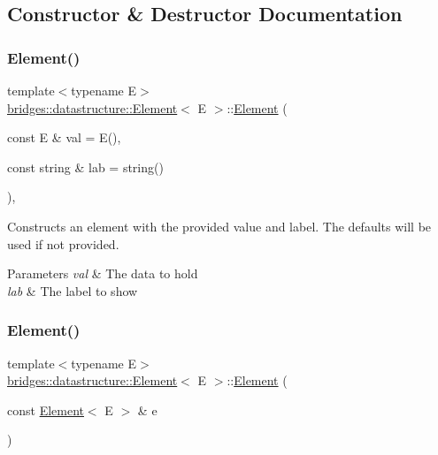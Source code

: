 \subsection{Constructor \& Destructor Documentation}
\mbox{\label{classbridges_1_1datastructure_1_1_element_a21820b1d88f2eb25adfe768bd03046d6}} 
\subsubsection{\texorpdfstring{Element()}{Element()}\hspace{0.1cm}{\footnotesize\ttfamily [1/2]}}
{\footnotesize\ttfamily template$<$typename E$>$ \\
\hyperlink{classbridges_1_1datastructure_1_1_element}{bridges\+::datastructure\+::\+Element}$<$ E $>$\+::\hyperlink{classbridges_1_1datastructure_1_1_element}{Element} (\begin{DoxyParamCaption}\item[{const E \&}]{val = {\ttfamily E()},  }\item[{const string \&}]{lab = {\ttfamily string()} }\end{DoxyParamCaption})\hspace{0.3cm}{\ttfamily [inline]}, {\ttfamily [explicit]}}

Constructs an element with the provided value and label. The defaults will be used if not provided.


\begin{DoxyParams}{Parameters}
{\em val} & The data to hold \\
\hline
{\em lab} & The label to show \\
\hline
\end{DoxyParams}
\mbox{\label{classbridges_1_1datastructure_1_1_element_a80eb6ac6925c4974c2e88e7e1446e231}} 
\subsubsection{\texorpdfstring{Element()}{Element()}\hspace{0.1cm}{\footnotesize\ttfamily [2/2]}}
{\footnotesize\ttfamily template$<$typename E$>$ \\
\hyperlink{classbridges_1_1datastructure_1_1_element}{bridges\+::datastructure\+::\+Element}$<$ E $>$\+::\hyperlink{classbridges_1_1datastructure_1_1_element}{Element} (\begin{DoxyParamCaption}\item[{const \hyperlink{classbridges_1_1datastructure_1_1_element}{Element}$<$ E $>$ \&}]{e }\end{DoxyParamCaption})\hspace{0.3cm}{\ttfamily [inline]}}

